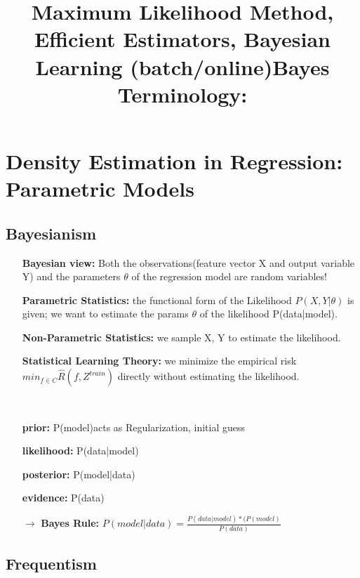 \section{Density Estimation in Regression: Parametric Models}\title{Maximum Likelihood Method, Efficient Estimators, Bayesian Learning (batch/online)}

\subsection{Bayesianism}

\begin{itemize}
    \item[]\textbf{Bayesian view: }Both the observations(feature vector X and output variable Y) and the parameters $\theta$ of the regression model are random variables!
    \item[]\textbf{Parametric Statistics: }the functional form of the Likelihood $P(X,Y|\theta)$ is given; we want to estimate the params $\theta$ of the likelihood P(data|model).
    \item[]\textbf{Non-Parametric Statistics: }we sample X, Y to estimate the likelihood.
    \item[]\textbf{Statistical Learning Theory: }we minimize the empirical risk $min_{f\in C} \hat{R}(f, Z^{train})$ directly without estimating the likelihood.
\end{itemize}{}
\\
\title{\textbf{Bayes Terminology:}}
\begin{itemize}
    \item[]\textbf{prior: }P(model)\quad acts as Regularization, initial guess
    \item[]\textbf{likelihood: }P(data|model)
    \item[]\textbf{posterior: }P(model|data)
    \item[]\textbf{evidence: }P(data)
    \item[$\rightarrow$]\textbf{Bayes Rule: }$P(model|data) = \frac{P(data|model)*(P(model)}{P(data)}$
\end{itemize}{}

\subsection{Frequentism}

